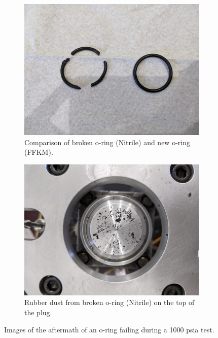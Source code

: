     

\begin{figure}[htpb]
    \vspace{16pt}
    \centering
    \begin{subfigure}[t]{0.45\textwidth}
        \centering
        \includegraphics[width=\textwidth]{design/photos/Broken_Oring_Comparison.jpg}
        \caption{Comparison of broken o-ring (Nitrile) and new o-ring (FFKM).}
        \label{fig:broken oring comp}
    \end{subfigure}
    \hfill
    \begin{subfigure}[t]{0.45\textwidth}
        \centering
        \includegraphics[width=\textwidth]{design/photos/Oring_Dust_Plug.jpg}
        \caption{Rubber dust from broken o-ring (Nitrile) on the top of the plug.}
        \label{fig:broken oring dust}
    \end{subfigure}
    \caption{Images of the aftermath of an o-ring failing during a 1000 psia test.}
    \label{fig:broken oring 2}
    \vspace{16pt}
\end{figure}
%